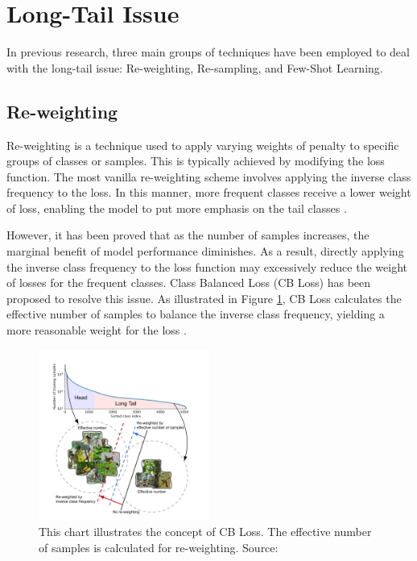 \section{Long-Tail Issue}
In previous research, three main groups of techniques have been employed to deal with the long-tail issue: Re-weighting, Re-sampling, and Few-Shot Learning.

\subsection{Re-weighting}
Re-weighting is a technique used to apply varying weights of penalty to specific groups of classes or samples. This is typically achieved by modifying the loss function. The most vanilla re-weighting scheme involves applying the inverse class frequency to the loss. In this manner, more frequent classes receive a lower weight of loss, enabling the model to put more emphasis on the tail classes \parencite{khan2017cost, mostajabi2015feedforward}.

However, it has been proved that as the number of samples increases, the marginal benefit of model performance diminishes. As a result, directly applying the inverse class frequency to the loss function may excessively reduce the weight of losses for the frequent classes. Class Balanced Loss (CB Loss) has been proposed to resolve this issue. As illustrated in Figure \ref{fig:concetpcbloss}, CB Loss calculates the effective number of samples to balance the inverse class frequency, yielding a more reasonable weight for the loss \parencite{cui2019class}.

\begin{figure}[ht]
    \centering
    \includegraphics[width=0.5\textwidth]{assets/charts_rw/CBLoss}
    \caption[CB Loss illustration]{This chart illustrates the concept of CB Loss. The effective number of samples is calculated for re-weighting. Source: \parencite{cui2019class}}
    \label{fig:concetpcbloss}
\end{figure}

